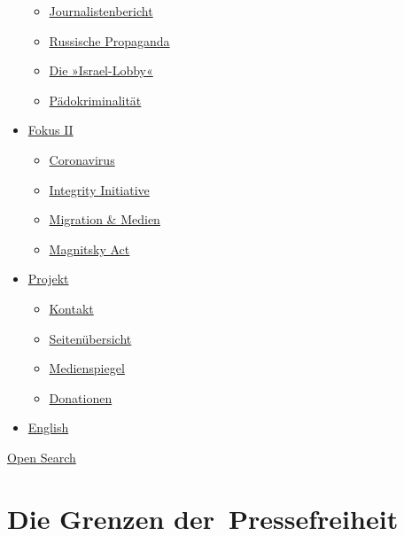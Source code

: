 \begin{itemize}
  \begin{itemize}
  \tightlist
  \item
    \href{https://swprs.org/bericht-eines-journalisten/}{Journalistenbericht}
  \item
    \href{https://swprs.org/russische-propaganda/}{Russische Propaganda}
  \item
    \href{https://swprs.org/die-israel-lobby-fakten-und-mythen/}{Die
    »Israel-Lobby«}
  \item
    \href{https://swprs.org/geopolitik-und-paedokriminalitaet/}{Pädokriminalität}
  \end{itemize}
\item
  \href{https://swprs.org/migration-und-medien/}{Fokus II}

  \begin{itemize}
  \tightlist
  \item
    \href{https://swprs.org/covid-19-hinweis-ii/}{Coronavirus}
  \item
    \href{https://swprs.org/die-integrity-initiative/}{Integrity
    Initiative}
  \item
    \href{https://swprs.org/migration-und-medien/}{Migration \& Medien}
  \item
    \href{https://swprs.org/der-fall-magnitsky/}{Magnitsky Act}
  \end{itemize}
\item
  \href{https://swprs.org/kontakt/}{Projekt}

  \begin{itemize}
  \tightlist
  \item
    \href{https://swprs.org/kontakt/}{Kontakt}
  \item
    \href{https://swprs.org/uebersicht/}{Seitenübersicht}
  \item
    \href{https://swprs.org/medienspiegel/}{Medienspiegel}
  \item
    \href{https://swprs.org/donationen/}{Donationen}
  \end{itemize}
\item
  \href{https://swprs.org/contact/}{English}
\end{itemize}

\protect\hyperlink{}{Open Search}

\hypertarget{die-grenzen-der-pressefreiheit}{%
\section{Die Grenzen
der~Pressefreiheit}\label{die-grenzen-der-pressefreiheit}}

